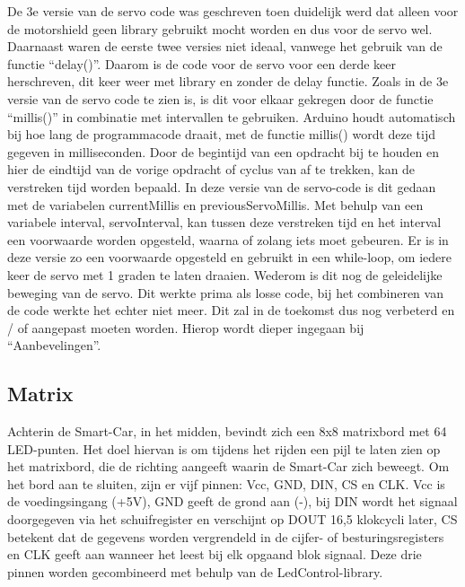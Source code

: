 De 3e versie van de servo code was geschreven toen duidelijk werd dat alleen voor de motorshield geen library gebruikt mocht worden en dus voor de servo wel. Daarnaast waren de eerste twee versies niet ideaal, vanwege het gebruik van de functie “delay()”. Daarom is de code voor de servo voor een derde keer herschreven, dit keer weer met library en zonder de delay functie\cite{Functie-millis-info}. 
Zoals in de 3e versie van de servo code te zien is, is dit voor elkaar gekregen door de functie “millis()” in combinatie met intervallen te gebruiken. Arduino\cite{ArduinoMEGA} houdt automatisch bij hoe lang de programmacode draait, met de functie millis() wordt deze tijd gegeven in milliseconden. Door de begintijd van een opdracht bij te houden en hier de eindtijd van de vorige opdracht of cyclus van af te trekken, kan de verstreken tijd worden bepaald. In deze versie van de servo-code is dit gedaan met de variabelen 
currentMillis en previousServoMillis. Met behulp van een variabele interval, servoInterval, kan tussen deze verstreken tijd en het interval een voorwaarde worden opgesteld, waarna of zolang iets moet gebeuren. Er is in deze versie zo een voorwaarde opgesteld en gebruikt in een while-loop, om iedere keer de servo met 1 graden te laten draaien. Wederom is dit nog de geleidelijke beweging van de servo.
Dit werkte prima als losse code, bij het combineren van de code werkte het echter niet meer. Dit zal in de toekomst dus nog verbeterd en / of aangepast moeten worden. Hierop wordt dieper ingegaan bij “Aanbevelingen”.


\subsection{Matrix}
Achterin de \gls{Smart-Car}, in het midden, bevindt zich een 8x8 matrixbord met 64 LED-punten. Het doel hiervan is om tijdens het rijden een pijl te laten zien op het matrixbord, die de richting aangeeft waarin de \gls{Smart-Car} zich beweegt. Om het bord aan te sluiten, zijn er vijf pinnen: Vcc, GND, DIN, CS en CLK. Vcc is de voedingsingang (+5V), GND geeft de grond aan (-), bij DIN wordt het signaal doorgegeven via het schuifregister en verschijnt op DOUT 16,5 klokcycli later, CS betekent dat de gegevens worden vergrendeld in de cijfer- of besturingsregisters en CLK geeft aan wanneer het leest bij elk opgaand blok signaal. Deze drie pinnen worden gecombineerd met behulp van de LedControl-library.

